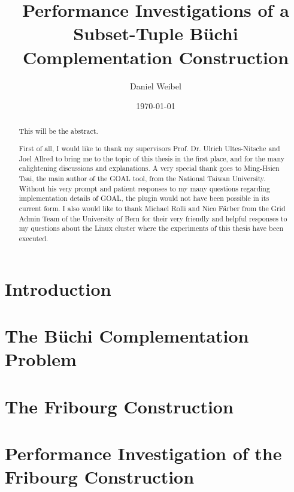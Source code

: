 \documentclass[standard]{styles/thesis}
\title{Performance Investigations of a Subset-Tuple Büchi Complementation Construction}
\author{Daniel Weibel}
\date{\today}
\begin{document}
\maketitle



\begin{abstract}
This will be the abstract.
\end{abstract}

\renewcommand{\abstractname}{Acknowledgements}
\begin{abstract}
First of all, I would like to thank my supervisors Prof. Dr. Ulrich Ultes-Nitsche and Joel Allred to bring me to the topic of this thesis in the first place, and for the many enlightening discussions and explanations. A very special thank goes to Ming-Hsien Tsai, the main author of the GOAL tool, from the National Taiwan University. Without his very prompt and patient responses to my many questions regarding implementation details of GOAL, the plugin would not have been possible in its current form. I also would like to thank Michael Rolli and Nico Färber from the Grid Admin Team of the University of Bern for their very friendly and helpful responses to my questions about the Linux cluster where the experiments of this thesis have been executed.
\end{abstract}

\dominitoc
\tableofcontents

\chapter{Introduction}
\label{chap_intro}
\newpage


\chapter{The Büchi Complementation Problem}
\label{chap_background}
\minitoc
\newpage


\chapter{The Fribourg Construction}
\label{chap_construction}
\minitoc
\newpage


\chapter{Performance Investigation of the Fribourg Construction}
\label{chap_investigation}
\minitoc
\newpage

\end{document}
